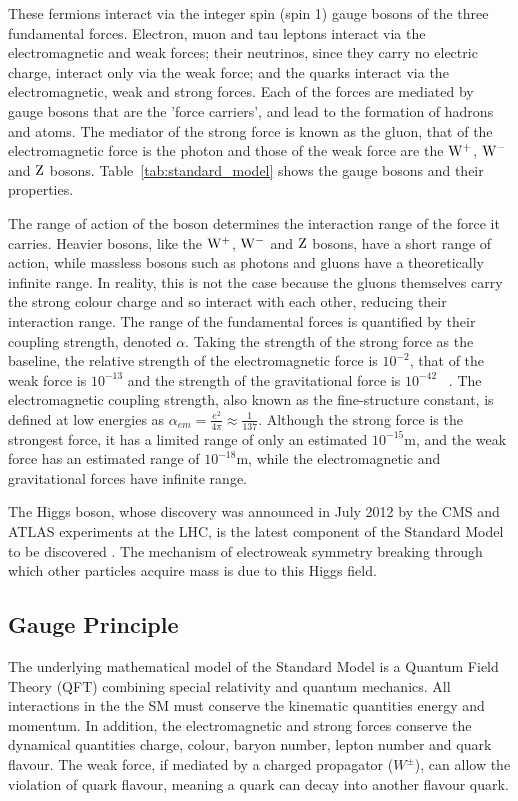These fermions interact via the integer spin (spin 1) gauge bosons of the three fundamental forces. Electron,
muon and tau leptons interact via the electromagnetic and weak forces; their neutrinos, since they carry no
electric charge, interact only via the weak force; and the quarks interact via the electromagnetic, weak and
strong forces. Each of the forces are mediated by gauge bosons that are the 'force carriers', and lead to the
formation of hadrons and atoms. The mediator of the strong force is known as the gluon, that of the
electromagnetic force is the photon and those of the weak force are the $\mathrm{W}^{+}$, $\mathrm{W}^{-}$ and $\mathrm{Z}$ bosons.
Table~\ref{tab:standard_model} shows the gauge bosons and their properties.

The range of action of the boson determines the interaction range of the force it carries. Heavier bosons,
like the $\mathrm{W}^{+}$, $\mathrm{W}^{-}$ and $\mathrm{Z}$ bosons, have a short range of action, while massless bosons such as
photons and gluons have a theoretically infinite range. In reality, this is not the case because the gluons
themselves carry the strong colour charge and so interact with each other, reducing their interaction range.
The range of the  fundamental forces is quantified by their coupling strength, denoted $\alpha$. Taking the
strength of the strong force as the baseline, the relative strength of the electromagnetic force is $10^{-2}$,
that of the weak force is $10^{-13}$ and the strength of the gravitational force is $10^{-42}$
~\cite{Griffiths:1987tj}. The electromagnetic coupling strength, also known as the fine-structure constant, is
defined at low energies as $\alpha_{em} = \frac{e^{2}}{4\pi}\approx \frac{1}{137}$. Although the strong force
is the strongest force, it has a limited range of only an estimated $10^{-15}$m, and the weak force has an
estimated range of $10^{-18}$m, while the electromagnetic and gravitational forces have infinite range.

The Higgs boson, whose discovery was announced in July 2012 by the CMS and ATLAS experiments at the LHC, is
the latest component of the Standard Model to be discovered \cite{Chatrchyan:2012xdj, Aad:2012tfa}. The
mechanism of electroweak symmetry breaking through which other particles acquire mass is due to this Higgs
field.

\subsection{Gauge Principle}
\label{ss:gauge_principle}
The underlying mathematical model of the Standard Model is a Quantum Field Theory (QFT) combining special
relativity and quantum mechanics. All interactions in the the SM must conserve the kinematic quantities energy
and momentum. In addition, the electromagnetic and strong forces conserve the dynamical quantities charge,
colour, baryon number, lepton number and quark flavour. The weak force, if mediated by a charged propagator
($W^{\pm}$), can allow the violation of quark flavour, meaning a quark can decay into another flavour quark.

